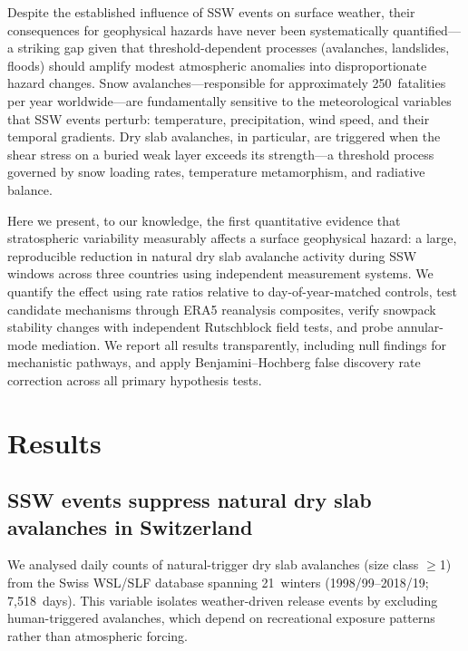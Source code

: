 \documentclass[11pt,letterpaper]{article}
\begin{document}
Despite the established influence of SSW events on surface weather, their consequences for geophysical hazards have never been systematically quantified---a striking gap given that threshold-dependent processes (avalanches, landslides, floods) should amplify modest atmospheric anomalies into disproportionate hazard changes. Snow avalanches---responsible for approximately 250~fatalities per year worldwide\cite{Techel2016}---are fundamentally sensitive to the meteorological variables that SSW events perturb: temperature, precipitation, wind speed, and their temporal gradients\cite{Schweizer2003,Schweizer2008}. Dry slab avalanches, in particular, are triggered when the shear stress on a buried weak layer exceeds its strength---a threshold process governed by snow loading rates, temperature metamorphism, and radiative balance\cite{McClung2006,Reuter2018}.

Here we present, to our knowledge, the first quantitative evidence that stratospheric variability measurably affects a surface geophysical hazard: a large, reproducible reduction in natural dry slab avalanche activity during SSW windows across three countries using independent measurement systems. We quantify the effect using rate ratios relative to day-of-year-matched controls, test candidate mechanisms through ERA5 reanalysis composites, verify snowpack stability changes with independent Rutschblock field tests, and probe annular-mode mediation. We report all results transparently, including null findings for mechanistic pathways, and apply Benjamini--Hochberg false discovery rate correction across all primary hypothesis tests.

\section*{Results}

\subsection*{SSW events suppress natural dry slab avalanches in Switzerland}

We analysed daily counts of natural-trigger dry slab avalanches (size class $\geq$1) from the Swiss WSL/SLF database spanning 21~winters (1998/99--2018/19; 7,518~days). This variable isolates weather-driven release events by excluding human-triggered avalanches, which depend on recreational exposure patterns rather than atmospheric forcing.
\end{document}
